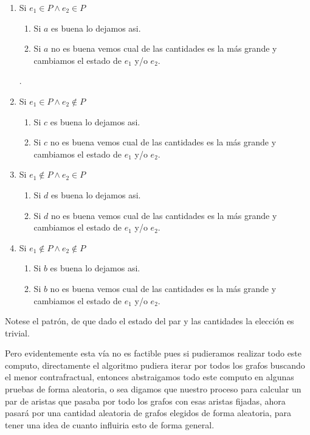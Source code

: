 \documentclass[11pt,letterpaper]{report} \usepackage[utf8]{inputenc} \usepackage[spanish]{babel}
\begin{document}
\begin{enumerate}
    \item Si $e_1 \in P \wedge e_2 \in P$ 
    \begin{enumerate}
        \item Si $a$ es buena lo dejamos asi.
        \item Si $a$ no es buena vemos cual de las cantidades es la m\'as grande y cambiamos el estado de $e_1$ y/o $e_2$.
    \end{enumerate}.

    \item Si $e_1 \in P \wedge  e_2 \notin P$ 
    \begin{enumerate}
        \item Si $c$ es buena lo dejamos asi.
        \item Si $c$ no es buena vemos cual de las cantidades es la m\'as grande y cambiamos el estado de $e_1$ y/o $e_2$.
    \end{enumerate}

    \item Si $e_1 \notin P \wedge  e_2 \in P$
    \begin{enumerate}
        \item Si $d$ es buena lo dejamos asi.
        \item Si $d$ no es buena vemos cual de las cantidades es la m\'as grande y cambiamos el estado de $e_1$ y/o $e_2$.
    \end{enumerate}
 

    \item Si $e_1 \notin P \wedge  e_2 \notin P$
    \begin{enumerate}
        \item Si $b$ es buena lo dejamos asi.
        \item Si $b$ no es buena vemos cual de las cantidades es la m\'as grande y cambiamos el estado de $e_1$ y/o $e_2$.
    \end{enumerate}
 
\end{enumerate} 

Notese el patr\'on, de que dado el estado del par y las cantidades la elecci\'on es trivial.

Pero evidentemente esta v\'ia no es factible pues si pudieramos realizar todo este computo, directamente el algoritmo pudiera iterar por todos los grafos buscando el menor contrafractual, entonces abstraigamos todo este computo en algunas pruebas de forma aleatoria, o sea digamos que nuestro proceso para calcular un par de aristas que pasaba por todo los grafos con esas aristas fijadas, ahora pasar\'a por una cantidad aleatoria de grafos elegidos de forma aleatoria, para tener una idea de cuanto influiria esto de forma general. 
\end{document}
